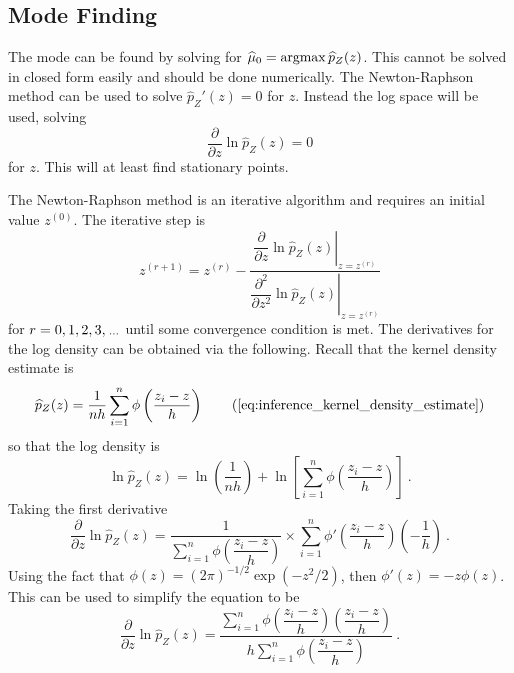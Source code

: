 \subsection{Mode Finding}

The mode can be found by solving for $\widehat{\mu}_0 = \operatorname*{argmax}\widehat{p}_Z(z)$. This cannot be solved in closed form easily and should be done numerically. The  Newton-Raphson method can be used to solve $\hat{p}_Z'(z) = 0$ for $z$. Instead the log space will be used, solving
\begin{equation}
	\dfrac{
		\partial
	}
	{
		\partial z
	}
	\ln\widehat{p}_Z(z)
	= 0
\end{equation}
for $z$. This will at least find stationary points.

The Newton-Raphson method is an iterative algorithm and requires an initial value $z^{(0)}$. The iterative step is
\begin{equation}
	z^{(r+1)} =
	z^{(r)}
	-\dfrac{
		\left.
			\dfrac{
				\partial
			}
			{
				\partial z
			}
			\ln\widehat{p}_Z(z)
		\right|_{z = z^{(r)}}
	}
	{
		\left.
			\dfrac{
				\partial^2
			}
			{
				\partial z^2
			}
			\ln\widehat{p}_Z(z)
		\right|_{z = z^{(r)}}
	} 
\end{equation}
for $r=0,1,2,3,\dotdotdot$ until some convergence condition is met. The derivatives for the log density can be obtained via the following. Recall that the kernel density estimate is
\begin{equation}
	\widehat{p}_Z(z)=
	\frac{1}{nh}
	\sum_{i=1}^n\phi\left(
		\dfrac{z_i-z}{h}
	\right)
	\tag{\ref{eq:inference_kernel_density_estimate}}
\end{equation}
so that the log density is
\begin{equation}
	\ln\widehat{p}_Z(z)=
	\ln\left(
		\dfrac{1}{nh}
	\right)
	+
	\ln\left[
		\sum_{i=1}^n
		\phi\left(
			\dfrac{
				z_i - z
			}
			{
				h
			}
		\right)
	\right]
	\ .
\end{equation}
Taking the first derivative
\begin{equation}
	\dfrac{
		\partial
	}
	{
		\partial z
	}
	\ln\widehat{p}_Z(z)
	=
	\dfrac{
		1
	}
	{
		\sum_{i=1}^n
		\phi\left(
			\dfrac{
				z_i - z
			}
			{
				h
			}
		\right)
	}
	\times
	\sum_{i=1}^n
	\phi'\left(
		\dfrac{
			z_i - z
		}
		{
			h
		}
	\right)
	\left(
		-\dfrac{
			1
		}
		{
			h
		}
	\right)
	\ .
\end{equation}
Using the fact that $\phi(z)=(2\pi)^{-1/2}\exp(-z^2/2)$, then $\phi'(z)=-z\phi(z)$. This can be used to simplify the equation to be
\begin{equation}
	\dfrac{
		\partial
	}
	{
		\partial z
	}
	\ln\widehat{p}_Z(z)
	=
	\dfrac{
		\sum_{i=1}^n
		\phi\left(
			\dfrac{
				z_i - z
			}
			{
				h
			}
		\right)
		\left(
			\dfrac{
				z_i - z
			}
			{
				h
			}
		\right)
	}
	{
		h
		\sum_{i=1}^n
		\phi\left(
			\dfrac{
				z_i - z
			}
			{
				h
			}
		\right)
	}
	\ .
\end{equation}
